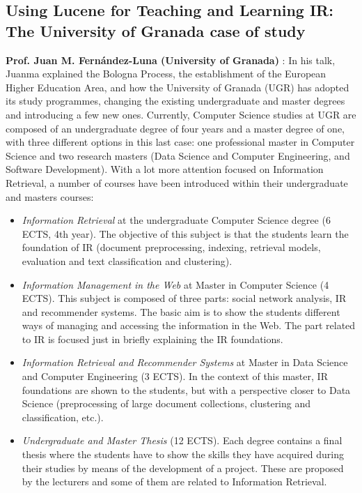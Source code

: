 
\subsection*{Using Lucene for Teaching and Learning IR: The University of Granada case of study} 

{\bf  Prof. Juan M. Fernández-Luna (University of Granada) }: In his talk, Juanma explained the Bologna Process, the establishment of the European Higher Education Area, and how the University of Granada (UGR) has adopted its study programmes, changing the existing undergraduate and master degrees and introducing a few new ones. Currently, Computer Science studies at UGR are composed of an undergraduate degree of four years and a master degree of one, with three different options in this last case: one professional master in Computer Science and two research masters (Data Science and Computer Engineering, and Software Development). With a lot more attention focused on Information Retrieval, a number of courses have been introduced within their undergraduate and masters courses: 

\begin{itemize}
\item {\it Information Retrieval} at the undergraduate Computer Science degree (6 ECTS, 4th year).  The objective of this subject is that the students learn the foundation of IR (document preprocessing, indexing, retrieval models, evaluation and text classification and clustering).

\item {\it Information Management in the Web} at Master in Computer Science (4 ECTS). This subject is composed of three parts: social network analysis, IR and recommender systems. The basic aim is to show the students different ways of managing and accessing the information in the Web. The part related to IR is focused just in briefly explaining the IR foundations. 

\item {\it Information Retrieval and Recommender Systems} at Master in Data Science and Computer Engineering (3 ECTS). In the context of this master, IR foundations are shown to the students, but with a perspective closer to Data Science (preprocessing of large document collections, clustering and classification, etc.).

\item {\it Undergraduate and Master Thesis}  (12 ECTS). Each degree contains a final thesis where the students have to show the skills they have acquired during their studies by means of the development of a project. These are proposed by the lecturers and some of them are related to Information Retrieval.
\end{itemize}

